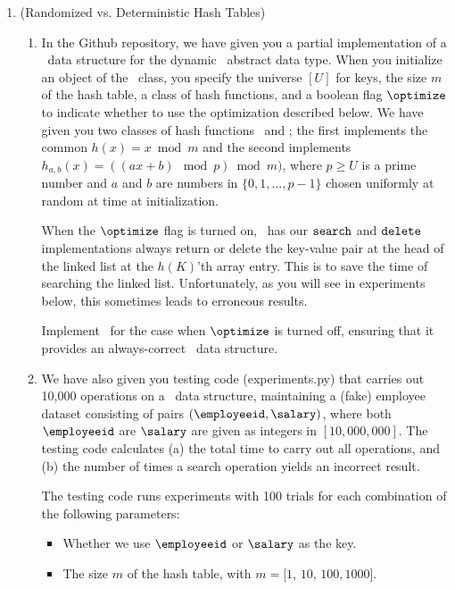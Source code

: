 \documentclass[11pt]{article}
\begin{document}
\begin{enumerate}
    \item (Randomized vs. Deterministic Hash Tables)


    \begin{enumerate} 
    \item In the Github repository, we have given you a
    partial implementation of a \HashTable\ data structure for the dynamic \Dictionary\ abstract data type.  When you initialize an object of the \HashTable\ class, you specify the universe $[U]$ for keys, the size $m$ of the hash table, a class of hash functions, and a boolean flag $\optimize$ to indicate whether to use the optimization described below. We have given you two classes of hash functions \DeterministicHash\ and \RandomHash; the first implements the common $h(x) = x \bmod m$ and the second implements $h_{a,b}(x) = ((ax+b) \mod p) \bmod m)$, where $p\geq U$ is a prime number and $a$ and $b$ are numbers in $\{0,1,\ldots,p-1\}$ chosen uniformly at random at time at initialization.


    When the $\optimize$ flag is turned on, \HashTable\ has our $\texttt{search}$ and $\texttt{delete}$ implementations always return or delete the key-value pair at the head of the linked list at the $h(K)$'th array entry.  This is to save the time of searching the linked list. Unfortunately, as you will see in experiments below, this sometimes leads to erroneous results. 

    Implement \HashTable\ for the case when $\optimize$ is turned off, ensuring that it provides an always-correct \Dictionary\ data structure.

    

    \item We have also given you testing code (experiments.py) that carries out 10,000 operations on a \HashTable\ data structure, maintaining a (fake) employee dataset consisting of pairs $(\employeeid,\salary)$, where both $\employeeid$ are $\salary$ are given as integers in $[10,000,000]$. The testing code calculates (a) the total time to carry out all operations, and (b) the number of times a search operation yields an incorrect result.  


    The testing code runs experiments with 100 trials for each combination of the following parameters:
    \begin{itemize}
        \item Whether we use $\employeeid$ or $\salary$ as the key.
        \item The size $m$ of the hash table, with $m=[1$, $10$, $100, 1000]$.
        


\end{itemize}
\end{enumerate}
\end{enumerate}
\end{document}
